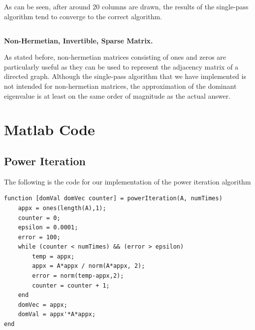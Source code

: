 \documentclass[11pt]{amsart}
\begin{document}


As can be seen, after around 20 columns are drawn, the results of the single-pass algorithm tend to converge to the correct algorithm.

\subsection{}\textbf{Non-Hermetian, Invertible, Sparse Matrix.}

As stated before, non-hermetian matrices consisting of ones and zeros are particularly useful as they can be used to represent the adjacency matrix of a directed graph. Although the single-pass algorithm that we have implemented is not intended for non-hermetian matrices, the approximation of the dominant eigenvalue is at least on the same order of magnitude as the actual answer.



\section{Matlab Code}

\subsection{Power Iteration}
The following is the code for our implementation of the power iteration algorithm
\begin{lstlisting}
function [domVal domVec counter] = powerIteration(A, numTimes)
    appx = ones(length(A),1);
    counter = 0;
    epsilon = 0.0001;
    error = 100;
    while (counter < numTimes) && (error > epsilon)
        temp = appx;
        appx = A*appx / norm(A*appx, 2);
        error = norm(temp-appx,2);
        counter = counter + 1;
    end
    domVec = appx;
    domVal = appx'*A*appx;
end
\end{lstlisting}
\end{document}
